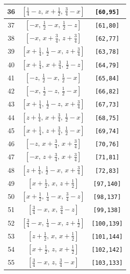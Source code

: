 \documentclass[fleqn,8pt]{jsarticle}
\begin{document}
\begin{longtable}{ccc}
36 & $\left[ \frac{1}{4} - z,\, x + \frac{1}{2},\, \frac{3}{4} - x \right]$ & {\tt [60,95]} \\ \hline
37 & $\left[ - x,\, \frac{1}{2} - x,\, \frac{1}{2} - z \right]$ & {\tt [61,80]} \\ \hline
38 & $\left[ - x,\, x + \frac{3}{4},\, z + \frac{3}{4} \right]$ & {\tt [62,77]} \\ \hline
39 & $\left[ x + \frac{1}{4},\, \frac{1}{2} - x,\, z + \frac{3}{4} \right]$ & {\tt [63,78]} \\ \hline
40 & $\left[ x + \frac{1}{4},\, x + \frac{3}{4},\, \frac{1}{2} - z \right]$ & {\tt [64,79]} \\ \hline
41 & $\left[ - z,\, \frac{1}{2} - x,\, \frac{1}{2} - x \right]$ & {\tt [65,84]} \\ \hline
42 & $\left[ - x,\, \frac{1}{2} - z,\, \frac{1}{2} - x \right]$ & {\tt [66,82]} \\ \hline
43 & $\left[ x + \frac{1}{4},\, \frac{1}{2} - z,\, x + \frac{3}{4} \right]$ & {\tt [67,73]} \\ \hline
44 & $\left[ z + \frac{1}{4},\, x + \frac{3}{4},\, \frac{1}{2} - x \right]$ & {\tt [68,75]} \\ \hline
45 & $\left[ x + \frac{1}{4},\, z + \frac{3}{4},\, \frac{1}{2} - x \right]$ & {\tt [69,74]} \\ \hline
46 & $\left[ - z,\, x + \frac{3}{4},\, x + \frac{3}{4} \right]$ & {\tt [70,76]} \\ \hline
47 & $\left[ - x,\, z + \frac{3}{4},\, x + \frac{3}{4} \right]$ & {\tt [71,81]} \\ \hline
48 & $\left[ z + \frac{1}{4},\, \frac{1}{2} - x,\, x + \frac{3}{4} \right]$ & {\tt [72,83]} \\ \hline
49 & $\left[ x + \frac{1}{2},\, x,\, z + \frac{1}{2} \right]$ & {\tt [97,140]} \\ \hline
50 & $\left[ x + \frac{1}{2},\, \frac{1}{4} - x,\, \frac{3}{4} - z \right]$ & {\tt [98,137]} \\ \hline
51 & $\left[ \frac{3}{4} - x,\, x,\, \frac{3}{4} - z \right]$ & {\tt [99,138]} \\ \hline
52 & $\left[ \frac{3}{4} - x,\, \frac{1}{4} - x,\, z + \frac{1}{2} \right]$ & {\tt [100,139]} \\ \hline
53 & $\left[ z + \frac{1}{2},\, x,\, x + \frac{1}{2} \right]$ & {\tt [101,144]} \\ \hline
54 & $\left[ x + \frac{1}{2},\, z,\, x + \frac{1}{2} \right]$ & {\tt [102,142]} \\ \hline
55 & $\left[ \frac{3}{4} - x,\, z,\, \frac{3}{4} - x \right]$ & {\tt [103,133]} \\ \hline

\end{longtable}
\end{document}
